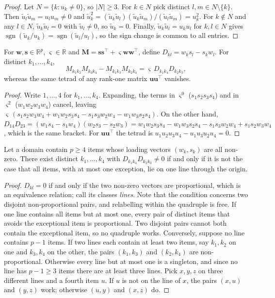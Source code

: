 \begin{proof}
Let $N=\{k:u_k\neq0\}$, so $|N|\ge3$. For $k\in N$ pick distinct $l,m\in N\setminus\{k\}$. Then $\tilde u_l\tilde u_m=u_lu_m\neq0$ and
$\tilde u_k^2=(\tilde u_k\tilde u_l)(\tilde u_k\tilde u_m)/(\tilde u_l\tilde u_m)=u_k^2$. For $k\notin N$ and any $l\in N$, $\tilde u_k\tilde u_l=0$ with $\tilde u_l\neq0$, so $\tilde u_k=0$. Finally, $\tilde u_k\tilde u_l=u_ku_l$ for $k,l\in N$ gives $\operatorname{sgn}(\tilde u_k/u_k)=\operatorname{sgn}(\tilde u_l/u_l)$, so the sign change is common to all entries.
\end{proof}

\begin{lemma}[Tetrads]\label{lem:app-tetrad}
For $\bm w,\bm s\in\mathbb R^p$, $\varsigma\in\mathbb R$ and $\bm M=\bm s\bm s^\top+\varsigma\bm w\bm w^\top$, define $D_{kl}=w_ks_l-s_kw_l$. For distinct $k_1,\dots,k_4$,
\[
  M_{k_1k_2}M_{k_3k_4}-M_{k_1k_3}M_{k_2k_4}=\varsigma\,D_{k_1k_4}D_{k_2k_3},
\]
whereas the same tetrad of any rank-one matrix $\bm u\bm u^\top$ vanishes.
\end{lemma}

\begin{proof}
Write $1,\dots,4$ for $k_1,\dots,k_4$. Expanding, the terms in $\varsigma^0$ ($s_1s_2s_3s_4$) and in $\varsigma^2$ ($w_1w_2w_3w_4$) cancel, leaving
$\varsigma\,(s_1s_2w_3w_4+w_1w_2s_3s_4-s_1s_3w_2w_4-w_1w_3s_2s_4)$. On the other hand,
$D_{14}D_{23}=(w_1s_4-s_1w_4)(w_2s_3-s_2w_3)=w_1w_2s_3s_4-w_1w_3s_2s_4-s_1s_3w_2w_4+s_1s_2w_3w_4$, which is the same bracket. For $\bm u\bm u^\top$ the tetrad is $u_1u_2u_3u_4-u_1u_3u_2u_4=0$.
\end{proof}

\begin{lemma}\label{lem:app-classes}
Let a domain contain $p\ge4$ items whose loading vectors $(w_k,s_k)$ are all non-zero. There exist distinct $k_1,\dots,k_4$ with $D_{k_1k_4}D_{k_2k_3}\neq0$ if and only if it is not the case that all items, with at most one exception, lie on one line through the origin.
\end{lemma}

\begin{proof}
$D_{kl}=0$ if and only if the two non-zero vectors are proportional, which is an equivalence relation; call its classes \emph{lines}. Note that the condition concerns two disjoint non-proportional pairs, and relabelling within the quadruple is free. If one line contains all items but at most one, every pair of distinct items that avoids the exceptional item is proportional. Two disjoint pairs cannot both contain the exceptional item, so no quadruple works. Conversely, suppose no line contains $p-1$ items. If two lines each contain at least two items, say $k_1,k_2$ on one and $k_3,k_4$ on the other, the pairs $(k_1,k_3)$ and $(k_2,k_4)$ are non-proportional. Otherwise every line but at most one is a singleton, and since no line has $p-1\ge3$ items there are at least three lines. Pick $x,y,z$ on three different lines and a fourth item $u$. If $u$ is not on the line of $x$, the pairs $(x,u)$ and $(y,z)$ work; otherwise $(u,y)$ and $(x,z)$ do.
\end{proof}

